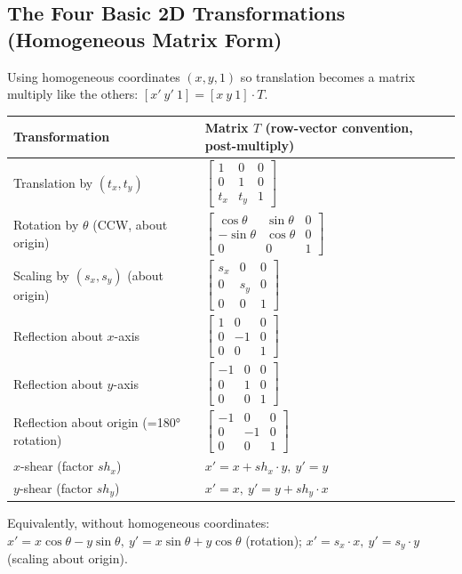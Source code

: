 \documentclass[12pt, a4paper]{article}
\begin{document}
\subsection{The Four Basic 2D Transformations (Homogeneous Matrix Form)}
Using homogeneous coordinates $(x,y,1)$ so translation becomes a matrix multiply like the others: $[x'\ y'\ 1] = [x\ y\ 1]\cdot T$.
\begin{center}
\renewcommand{\arraystretch}{1.5}
\begin{tabular}{ll}
\toprule
\textbf{Transformation} & \textbf{Matrix} $T$ (row-vector convention, post-multiply) \\
\midrule
Translation by $(t_x,t_y)$ & $\begin{bmatrix}1&0&0\\0&1&0\\t_x&t_y&1\end{bmatrix}$ \\[0.9em]
Rotation by $\theta$ (CCW, about origin) & $\begin{bmatrix}\cos\theta&\sin\theta&0\\-\sin\theta&\cos\theta&0\\0&0&1\end{bmatrix}$ \\[0.9em]
Scaling by $(s_x,s_y)$ (about origin) & $\begin{bmatrix}s_x&0&0\\0&s_y&0\\0&0&1\end{bmatrix}$ \\[0.9em]
Reflection about $x$-axis & $\begin{bmatrix}1&0&0\\0&-1&0\\0&0&1\end{bmatrix}$ \\[0.9em]
Reflection about $y$-axis & $\begin{bmatrix}-1&0&0\\0&1&0\\0&0&1\end{bmatrix}$ \\[0.9em]
Reflection about origin (=180° rotation) & $\begin{bmatrix}-1&0&0\\0&-1&0\\0&0&1\end{bmatrix}$ \\[0.9em]
$x$-shear (factor $sh_x$) & $x'=x+sh_x\cdot y,\ y'=y$ \\[0.3em]
$y$-shear (factor $sh_y$) & $x'=x,\ y'=y+sh_y\cdot x$ \\
\bottomrule
\end{tabular}
\end{center}
Equivalently, without homogeneous coordinates: $x'=x\cos\theta-y\sin\theta,\ y'=x\sin\theta+y\cos\theta$ (rotation); $x'=s_x\cdot x,\ y'=s_y\cdot y$ (scaling about origin).
\end{document}
